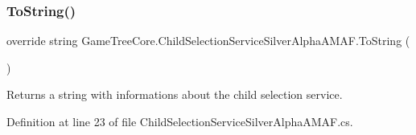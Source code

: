 \subsubsection{\texorpdfstring{To\+String()}{ToString()}}
{\footnotesize\ttfamily override string Game\+Tree\+Core.\+Child\+Selection\+Service\+Silver\+Alpha\+A\+M\+A\+F.\+To\+String (\begin{DoxyParamCaption}{ }\end{DoxyParamCaption})}



Returns a string with informations about the child selection service. 



Definition at line 23 of file Child\+Selection\+Service\+Silver\+Alpha\+A\+M\+A\+F.\+cs.

